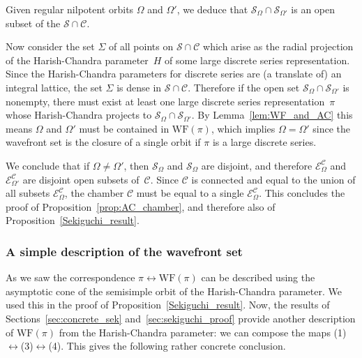 \documentclass[10pt,leqno]{article}
\newcommand{\WF}{\mathrm{WF}}
\newcommand{\ECom}{\mathcal{E}^{\mathcal{C}}_\Omega}
\begin{document}
Given regular nilpotent orbits $\Omega$ and $\Omega'$, we deduce that $\mathcal{S}_\Omega \cap \mathcal{S}_{\Omega'}$ is an open subset of the $\mathcal{S} \cap \mathcal{C}$.

Now consider the set $\Sigma$ of all points on $\mathcal{S} \cap \mathcal{C}$ which arise as the radial projection of the Harish-Chandra parameter~$H$ of some large discrete series representation. Since the Harish-Chandra parameters for discrete series are (a translate of) an integral lattice, the set $\Sigma$ is dense in $\mathcal{S} \cap \mathcal{C}$. Therefore if the open set $\mathcal{S}_\Omega \cap \mathcal{S}_{\Omega'}$ is nonempty, there must exist at least one large discrete series representation~$\pi$ whose Harish-Chandra projects to $\mathcal{S}_\Omega \cap \mathcal{S}_{\Omega'}$. By Lemma~\ref{lem:WF_and_AC} this means $\Omega$ and $\Omega'$ must be contained in $\WF(\pi)$, which implies $\Omega = \Omega'$ since the wavefront set is the closure of a single orbit if $\pi$ is a large discrete series. 

We conclude that if $\Omega \neq \Omega'$, then $\mathcal{S}_\Omega$ and $\mathcal{S}_\Omega$ are disjoint, and therefore $\ECom$ and $\mathcal{E}^{\mathcal{C}}_{\Omega'}$ are disjoint open subsets of~$\mathcal{C}$. Since $\mathcal{C}$ is connected and equal to the union of all subsets $\mathcal{E}^{\mathcal{C}}_{\Omega}$, the chamber $\mathcal{C}$ must be equal to a single $\ECom$. This concludes the proof of Proposition~\ref{prop:AC_chamber}, and therefore also of Proposition~\ref{Sekiguchi_result}.


\subsubsection{A simple description of the wavefront set}\label{sec:alternate_WF}


As we saw the correspondence $\pi \leftrightarrow \WF(\pi)$ can be described using the asymptotic cone of the semisimple orbit of the Harish-Chandra parameter. We used this in the proof of Proposition~\ref{Sekiguchi_result}. Now, the results of Sections~\ref{sec:concrete_sek} and~\ref{sec:sekiguchi_proof} provide another description of $\WF(\pi)$ from the Harish-Chandra parameter: we can compose the maps (1)$\leftrightarrow$(3)$\leftrightarrow$(4). This gives the following rather concrete conclusion.
\end{document}
